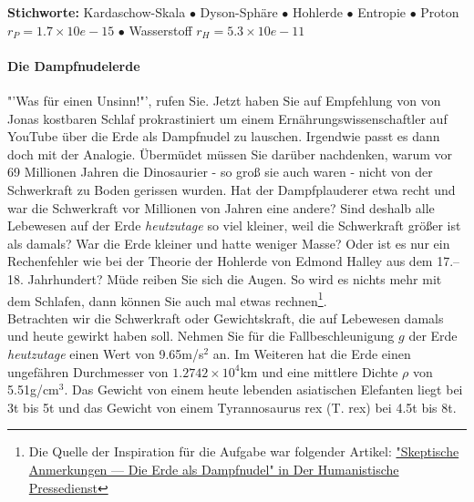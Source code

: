 \documentclass[a4paper, 9pt]{scrartcl}\usepackage[]{graphicx}\usepackage[]{xcolor}
\begin{document}
{\tiny\textbf{Stichworte:} Kardaschow-Skala $\bullet$ Dyson-Sphäre $\bullet$ Hohlerde $\bullet$ Entropie $\bullet$ Proton $r_P = 1.7 \times 10e-15$ $\bullet$ Wasserstoff $r_H = 5.3\times 10e-11$}

\ifcollection
\paragraph{Die Dampfnudelerde}
\fi



"'Was für einen Unsinn!"', rufen Sie. Jetzt haben Sie auf Empfehlung von von Jonas kostbaren Schlaf prokrastiniert um einem Ernährungswissenschaftler auf YouTube über die Erde als Dampfnudel zu lauschen. Irgendwie passt es dann doch mit der Analogie. Übermüdet müssen Sie darüber nachdenken, warum vor 69 Millionen Jahren die Dinosaurier - so groß sie auch waren - nicht von der Schwerkraft zu Boden gerissen wurden. Hat der Dampfplauderer etwa recht und war die Schwerkraft vor Millionen von Jahren eine andere?  Sind deshalb alle Lebewesen auf der Erde \textit{heutzutage} so viel kleiner, weil die Schwerkraft größer ist als damals? War die Erde kleiner und hatte weniger Masse? Oder ist es nur ein Rechenfehler wie bei der Theorie der Hohlerde von Edmond Halley aus dem 17.–18. Jahrhundert? Müde reiben Sie sich die Augen. So wird es nichts mehr mit dem Schlafen, dann können Sie auch mal etwas rechnen\footnote{Die Quelle der Inspiration
  für die Aufgabe war folgender Artikel:
  \href{https://hpd.de/artikel/erde-dampfnudel-22236}{"Skeptische Anmerkungen --- Die Erde als Dampfnudel" in Der Humanistische Pressedienst}}.  \\

Betrachten wir die Schwerkraft oder Gewichtskraft, die auf Lebewesen damals und heute gewirkt haben soll. Nehmen Sie für die Fallbeschleunigung $g$ der Erde \textit{heutzutage} einen Wert von 9.65m/s$^2$ an. Im Weiteren hat die Erde einen ungefähren Durchmesser von \ensuremath{1.2742\times 10^{4}}km und eine mittlere Dichte $\rho$ von 5.51g/cm$^3$. Das Gewicht von einem heute lebenden asiatischen Elefanten liegt bei 3t bis 5t und das Gewicht von einem Tyrannosaurus rex (T. rex) bei 4.5t bis 8t.
\end{document}
